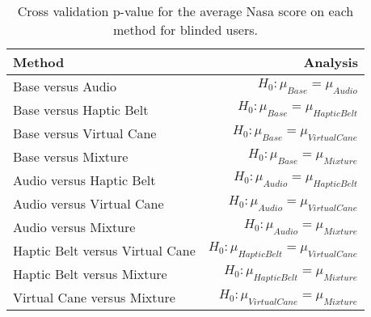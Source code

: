 
\begin{table}[!htb]
\centering
\caption{Cross validation p-value for the average Nasa score on each method for blinded users.}
\label{tab:lsd_nasa_avg}
\begin{tabular}{lr}
\toprule
                         Method &                                       Analysis \\
\midrule
              Base versus Audio &               $H_0 : \mu_{Base} = \mu_{Audio}$ \\
        Base versus Haptic Belt &         $H_0 : \mu_{Base} = \mu_{Haptic Belt}$ \\
       Base versus Virtual Cane &        $H_0 : \mu_{Base} = \mu_{Virtual Cane}$ \\
            Base versus Mixture &             $H_0 : \mu_{Base} = \mu_{Mixture}$ \\
       Audio versus Haptic Belt &        $H_0 : \mu_{Audio} = \mu_{Haptic Belt}$ \\
      Audio versus Virtual Cane &       $H_0 : \mu_{Audio} = \mu_{Virtual Cane}$ \\
           Audio versus Mixture &            $H_0 : \mu_{Audio} = \mu_{Mixture}$ \\
Haptic Belt versus Virtual Cane & $H_0 : \mu_{Haptic Belt} = \mu_{Virtual Cane}$ \\
     Haptic Belt versus Mixture &      $H_0 : \mu_{Haptic Belt} = \mu_{Mixture}$ \\
    Virtual Cane versus Mixture &     $H_0 : \mu_{Virtual Cane} = \mu_{Mixture}$ \\
\bottomrule
\end{tabular}
\end{table}

